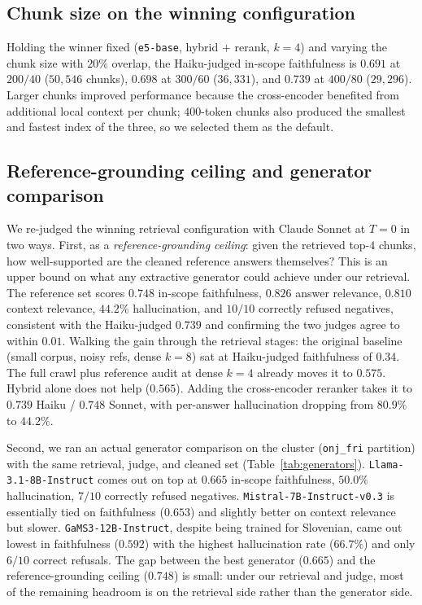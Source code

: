 \documentclass[fleqn,moreauthors,10pt]{ds_report}
\begin{document}
\subsection*{Chunk size on the winning configuration}
Holding the winner fixed (\texttt{e5-base}, hybrid + rerank, $k{=}4$) and varying the chunk size with $20\%$ overlap, the Haiku-judged in-scope faithfulness is $0.691$ at $200/40$ ($50{,}546$ chunks), $0.698$ at $300/60$ ($36{,}331$), and $0.739$ at $400/80$ ($29{,}296$). Larger chunks improved performance because the cross-encoder benefited from additional local context per chunk; $400$-token chunks also produced the smallest and fastest index of the three, so we selected them as the default.

\subsection*{Reference-grounding ceiling and generator comparison}
We re-judged the winning retrieval configuration with Claude Sonnet at $T{=}0$ in two ways. First, as a \emph{reference-grounding ceiling}: given the retrieved top-$4$ chunks, how well-supported are the cleaned reference answers themselves? This is an upper bound on what any extractive generator could achieve under our retrieval. The reference set scores $0.748$ in-scope faithfulness, $0.826$ answer relevance, $0.810$ context relevance, $44.2\%$ hallucination, and $10/10$ correctly refused negatives, consistent with the Haiku-judged $0.739$ and confirming the two judges agree to within $0.01$. Walking the gain through the retrieval stages: the original baseline (small corpus, noisy refs, dense $k{=}8$) sat at Haiku-judged faithfulness of $0.34$. The full crawl plus reference audit at dense $k{=}4$ already moves it to $0.575$. Hybrid alone does not help ($0.565$). Adding the cross-encoder reranker takes it to $0.739$ Haiku / $0.748$ Sonnet, with per-answer hallucination dropping from $80.9\%$ to $44.2\%$.

Second, we ran an actual generator comparison on the cluster (\texttt{onj\_fri} partition) with the same retrieval, judge, and cleaned set (Table~\ref{tab:generators}). \texttt{Llama-3.1-8B-Instruct} comes out on top at $0.665$ in-scope faithfulness, $50.0\%$ hallucination, $7/10$ correctly refused negatives. \texttt{Mistral-7B-Instruct-v0.3} is essentially tied on faithfulness ($0.653$) and slightly better on context relevance but slower. \texttt{GaMS3-12B-Instruct}, despite being trained for Slovenian, came out lowest in faithfulness ($0.592$) with the highest hallucination rate ($66.7\%$) and only $6/10$ correct refusals. The gap between the best generator ($0.665$) and the reference-grounding ceiling ($0.748$) is small: under our retrieval and judge, most of the remaining headroom is on the retrieval side rather than the generator side.
\end{document}
